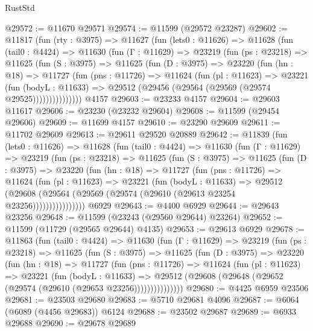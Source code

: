 \begin{lexlean}{RustStd}
\begin{coremodule}
@29572 := @11670 @29571
@29574 := @11599 (@29572 @23287)
@29602 := @11817
    (fun (rty : @3975) =>
    @11627
      (fun (lets0 : @11626) =>
      @11628
        (fun (tail0 : @4424) =>
        @11630
          (fun (Γ : @11629) =>
          @23219
            (fun (ps : @23218) =>
            @11625
              (fun (S : @3975) =>
              @11625
                (fun (D : @3975) =>
                @23220
                  (fun (hn : @18) =>
                  @11727
                    (fun (pns : @11726) =>
                    @11624
                      (fun (pl : @11623) =>
                      @23221
                        (fun (bodyL : @11633) =>
                        @29512 (@29456 (@29564 (@29569 (@29574 @29525)))))))))))))))
    @4157
@29603 := @23233 @4157
@29604 := @29603 @11617
@29606 := @23230 (@23232 @29604)
@29608 := @11599 (@29454 @29606)
@29609 := @11699 @4157
@29610 := @23290 @29609
@29611 := @11702 @29609
@29613 := @29611 @29520 @20889
@29642 := @11839
    (fun (lets0 : @11626) =>
    @11628
      (fun (tail0 : @4424) =>
      @11630
        (fun (Γ : @11629) =>
        @23219
          (fun (ps : @23218) =>
          @11625
            (fun (S : @3975) =>
            @11625
              (fun (D : @3975) =>
              @23220
                (fun (hn : @18) =>
                @11727
                  (fun (pns : @11726) =>
                  @11624
                    (fun (pl : @11623) =>
                    @23221
                      (fun (bodyL : @11633) =>
                      @29512
                        (@29608
                          (@29564 (@29569 (@29574 (@29610 (@29613 @23254 @23256))))))))))))))))
    @6929
@29643 := @4400 @6929
@29644 := @29643 @23256
@29648 := @11599 (@23243 (@29560 @29644) @23264)
@29652 := @11599 (@11729 (@29565 @29644) @4135)
@29653 := @29613 @6929
@29678 := @11863
    (fun (tail0 : @4424) =>
    @11630
      (fun (Γ : @11629) =>
      @23219
        (fun (ps : @23218) =>
        @11625
          (fun (S : @3975) =>
          @11625
            (fun (D : @3975) =>
            @23220
              (fun (hn : @18) =>
              @11727
                (fun (pns : @11726) =>
                @11624
                  (fun (pl : @11623) =>
                  @23221
                    (fun (bodyL : @11633) =>
                    @29512 (@29608 (@29648 (@29652 (@29574 (@29610 (@29653 @23256)))))))))))))))
@29680 := @4425 @6959 @23506
@29681 := @23503 @29680
@29683 := @5710 @29681 @4096
@29687 := @6064 (@6089 (@4456 @29683)) @6124
@29688 := @23502 @29687
@29689 := @6933 @29688
@29690 := @29678 @29689

\end{coremodule}
\end{lexlean}
